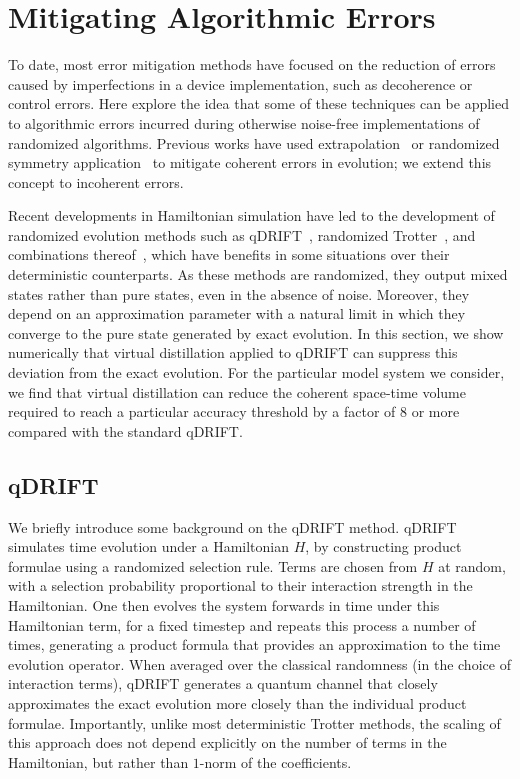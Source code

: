 \documentclass[
amsmath,
amssymb,
aps,
pra,
reprint,
twocolumn,
superscriptaddress,
longbibliography,
showkeys,
floatfix
]{revtex4-1}
\newcommand{\replace}[2]{#2}
\begin{document}
\section{Mitigating Algorithmic Errors}
\label{sec:AlgorithmicErrors}
To date, most error mitigation methods have focused on the reduction of errors
caused by imperfections in a device implementation, such as decoherence or
control errors. 
Here explore the idea that some of these techniques can be applied to
algorithmic errors incurred during otherwise noise-free implementations of
randomized algorithms. 
Previous works have used extrapolation~\cite{Endo2019-rr} or randomized symmetry
application~\cite{Tran2020-ts} to mitigate coherent errors in
evolution; we extend this concept to incoherent errors.

\replace{In particular, r}{R}ecent developments in Hamiltonian simulation have
led to the development of randomized evolution methods such as
qDRIFT~\cite{Campbell2019-id}, randomized Trotter~\cite{Childs2019-dv}, and
combinations thereof~\cite{Ouyang2020-pp}, which have benefits in some
situations over their deterministic counterparts. 
As these methods are randomized, they output mixed states rather than pure
states, even in the absence of noise. 
Moreover, they depend on an approximation parameter with a natural limit in
which they converge to the pure state generated by exact evolution.
In this section, we show numerically that virtual distillation applied to qDRIFT
can suppress this deviation from the exact evolution.
For the particular model system we consider, we find that virtual distillation
can reduce the coherent space-time volume required to reach a particular
accuracy threshold by a factor of $8$ or more compared with the standard qDRIFT.

\subsection{qDRIFT}\label{sec:BackgroundqDRIFT}
We briefly introduce some background on the qDRIFT method.
qDRIFT simulates time evolution under a Hamiltonian $H$, by constructing product
formulae using a randomized selection rule. 
Terms are chosen from $H$ at random, with a selection probability proportional
to their interaction strength in the Hamiltonian. 
One then evolves the system forwards in time under this Hamiltonian term, for a
fixed timestep and repeats this process a number of times, generating a product formula that provides an approximation to the time evolution operator. 
When averaged over the classical randomness (in the choice of interaction
terms), qDRIFT generates a quantum channel that closely approximates the exact
evolution more closely than the individual product formulae.
Importantly, unlike most deterministic Trotter methods, the scaling of this
approach does not depend explicitly on the number of terms in the Hamiltonian,
but rather than $1$-norm of the coefficients.
\end{document}
